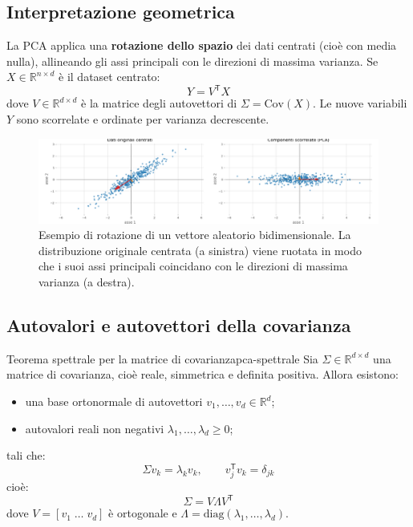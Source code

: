 \subsection{Interpretazione geometrica}

La PCA applica una \textbf{rotazione dello spazio} dei dati centrati (cioè con
media nulla), allineando gli assi principali con le direzioni di massima
varianza. Se \( X \in \mathbb{R}^{n \times d} \) è il dataset centrato:
\[
Y = V^\mathsf{T} X
\]
dove \( V \in \mathbb{R}^{d \times d} \) è la matrice degli autovettori di \(
\Sigma = \mathrm{Cov}(X) \). Le nuove variabili \( Y \) sono scorrelate e
ordinate per varianza decrescente.

\begin{figure}[H]
    \centering
    \includegraphics[width=\textwidth]{images/th_10_12/rotation_transformation.png}
    \caption{Esempio di rotazione di un vettore aleatorio bidimensionale. La distribuzione originale centrata (a sinistra) viene ruotata in modo che i suoi assi principali coincidano con le direzioni di massima varianza (a destra).}
    \label{fig:rotation_transformation}
\end{figure}

\subsection{Autovalori e autovettori della covarianza}

\begin{teorema}{Teorema spettrale per la matrice di covarianza}{pca-spettrale}
Sia \( \Sigma \in \mathbb{R}^{d \times d} \) una matrice di covarianza, cioè
reale, simmetrica e definita positiva. Allora esistono:
\begin{itemize}
  \item una base ortonormale di autovettori \( v_1, \dots, v_d \in \mathbb{R}^d
  \);
  \item autovalori reali non negativi \( \lambda_1, \dots, \lambda_d \geq 0 \);
\end{itemize}
tali che:
\[
\Sigma v_k = \lambda_k v_k, \qquad v_j^\mathsf{T} v_k = \delta_{jk}
\]
cioè:
\[
\Sigma = V \Lambda V^\mathsf{T}
\]
dove \( V = [v_1 \; \dots \; v_d] \) è ortogonale e \( \Lambda =
\mathrm{diag}(\lambda_1, \dots, \lambda_d) \).
\end{teorema}

